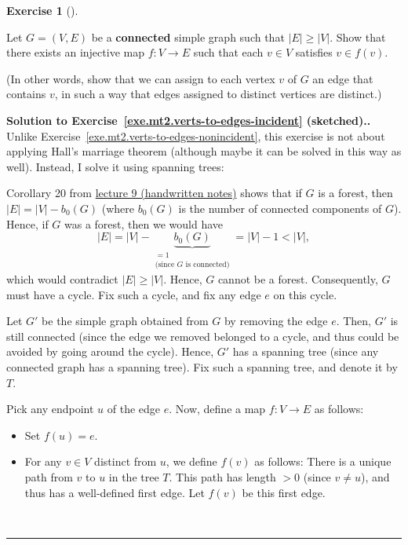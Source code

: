 \documentclass[numbers=enddot,12pt,final,onecolumn,notitlepage]{scrartcl}%
\newcounter{exer}
\theoremstyle{definition}
\newtheorem{exmp}[exer]{Exercise}
\newenvironment{exercise}[1][]
{\begin{exmp}[#1]\begin{leftbar}}
{\end{leftbar}\end{exmp}}
\newenvironment{proof}[1][Proof]{\noindent\textbf{#1.} }{\ \rule{0.5em}{0.5em}}
\newcommand{\abs}[1]{\left| #1 \right|}
\newcommand{\tup}[1]{\left( #1 \right)}
\newcommand{\underbrack}[2]{\underbrace{#1}_{\substack{#2}}}
\begin{document}
\begin{exercise} \label{exe.mt2.verts-to-edges-incident}
Let $G = \tup{V, E}$ be a \textbf{connected} simple graph such that
$\abs{E} \geq \abs{V}$.
Show that there exists an injective map $f : V \to E$ such that each
$v \in V$ satisfies $v \in f\tup{v}$.

(In other words, show that we can assign to each vertex $v$ of $G$
an edge that contains $v$, in such a way that edges assigned
to distinct vertices are distinct.)
\end{exercise}

\begin{proof}[Solution to
Exercise~\ref{exe.mt2.verts-to-edges-incident} (sketched).]
Unlike Exercise~\ref{exe.mt2.verts-to-edges-nonincident}, this
exercise is not about applying Hall's marriage theorem (although maybe
it can be solved in this way as well).
Instead, I solve it using spanning trees:

Corollary 20 from
\href{http://www-users.math.umn.edu/~dgrinber/5707s17/5707lec9.pdf}{lecture 9 (handwritten notes)}
shows that if $G$ is a forest, then $\abs{E} = \abs{V} - b_0 \tup{G}$
(where $b_0 \tup{G}$ is the number of connected components of $G$).
Hence, if $G$ was a forest, then we would have
\[
\abs{E} = \abs{V} - \underbrack{b_0 \tup{G}}
                               {= 1 \\ \text{(since } G
                                    \text{ is connected)}}
= \abs{V} - 1 < \abs{V} ,
\]
which would contradict $\abs{E} \geq \abs{V}$.
Hence, $G$ cannot be a forest.
Consequently, $G$ must have a cycle.
Fix such a cycle, and fix any edge $e$ on this cycle.

Let $G'$ be the simple graph obtained from $G$ by removing the edge
$e$.
Then, $G'$ is still connected (since the edge we removed belonged to
a cycle, and thus could be avoided by going around the cycle).
Hence, $G'$ has a spanning tree (since any connected graph has a
spanning tree).
Fix such a spanning tree, and denote it by $T$.

Pick any endpoint $u$ of the edge $e$.
Now, define a map $f : V \to E$ as follows:
\begin{itemize}
\item Set $f \tup{u} = e$.
\item For any $v \in V$ distinct from $u$, we define $f \tup{v}$ as
      follows:
      There is a unique path from $v$ to $u$ in the tree $T$.
      This path has length $> 0$ (since $v \neq u$), and thus has a
      well-defined first edge.
      Let $f \tup{v}$ be this first edge.
\end{itemize}


\end{proof}
\end{document}
